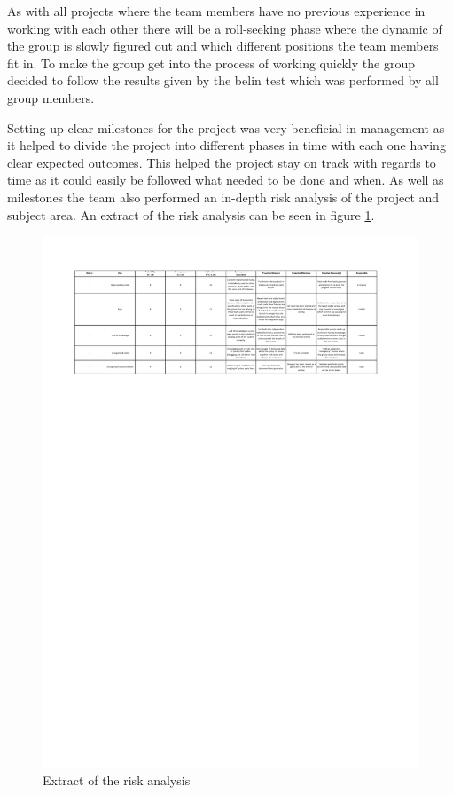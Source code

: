 \documentclass[11pt, titlepage]{article} %
\begin{document}
As with all projects where the team members have no previous experience in working with each other there will be a roll-seeking phase where the dynamic of the group is slowly figured out and which different positions the team members fit in. To make the group get into the process of working quickly the group decided to follow the results given by the belin test which was performed by all group members.

Setting up clear milestones for the project was very beneficial in management as it helped to divide the project into different phases in time with each one having clear expected outcomes. This helped the project stay on track with regards to time as it could easily be followed what needed to be done and when. As well as milestones the team also performed an in-depth risk analysis of the project and subject area. An extract of the risk analysis can be seen in figure \ref{fig:risks}.

\begin{figure}[]
	\centering
   	\includegraphics[]{risks.pdf}
   	\caption{Extract of the risk analysis}
    \label{fig:risks}
\end{figure}
\end{document}
